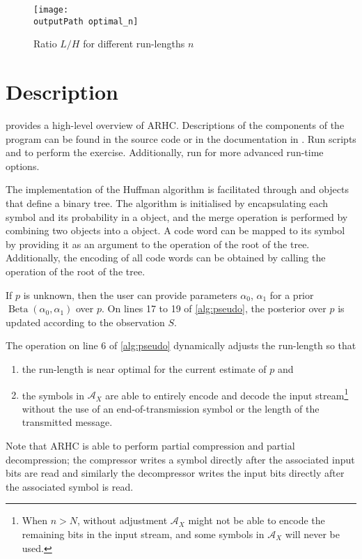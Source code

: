 \documentclass[letterpaper,11pt]{extarticle}
\newcommand{\outputPath}{output/}
\begin{document}
\begin{figure}[ht]
    \centering
    \texttt{[image: \\outputPath optimal\_n]}
    \caption{Ratio $L/H$ for different run-lengths $n$}
    \label{fig:ratio}
\end{figure}


\section{Description}
 provides a high-level overview of ARHC. Descriptions of the components of the program can be found in the source code or in the documentation in . Run scripts  and  to perform the exercise. Additionally, run  for more advanced run-time options.

The implementation of the Huffman algorithm is facilitated through  and  objects that define a binary tree. The algorithm is initialised by encapsulating each symbol and its probability in a  object, and the merge operation is performed by combining two  objects into a  object. A code word can be mapped to its symbol by providing it as an argument to the  operation of the root  of the tree. Additionally, the encoding of all code words can be obtained by calling the  operation of the root  of the tree.

If $p$ is unknown, then the user can provide parameters $\alpha_0$, $\alpha_1$ for a prior $\operatorname{Beta}(\alpha_0, \alpha_1)$ over $p$. On lines 17 to 19 of \cref{alg:pseudo}, the posterior over $p$ is updated according to the observation $S$.

The operation on line 6 of \cref{alg:pseudo} dynamically adjusts the run-length so that
\begin{enumerate}
    \item the run-length is near optimal for the current estimate of $p$ and
    \item the symbols in $\mathcal{A}_X$ are able to entirely encode and decode the input stream\footnote{When $n>N$, without adjustment $\mathcal{A}_X$ might not be able to encode the remaining bits in the input stream, and some symbols in $\mathcal{A}_X$ will never be used.} without the use of an end-of-transmission symbol or the length of the transmitted message.
\end{enumerate}

Note that ARHC is able to perform partial compression and partial decompression; the compressor writes a symbol directly after the associated input bits are read and similarly the decompressor writes the input bits directly after the associated symbol is read.
\end{document}
